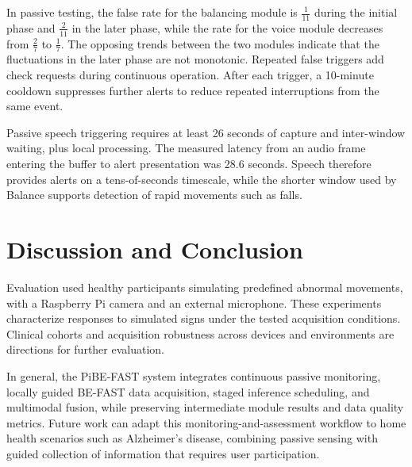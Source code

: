 \documentclass[conference]{IEEEtran}
\providecommand{\revisioncolor}{black}
\DeclareRobustCommand{\revised}[1]{{\color{\revisioncolor}#1}}
\begin{document}
In passive testing, the false rate for the balancing module is $\frac{1}{11}$ during the initial phase and  $\frac{2}{11}$ in the later phase, while the rate for the voice module decreases from $\frac{2}{7}$ to $\frac{1}{7}$. The opposing trends between the two modules indicate that the fluctuations in the later phase are not monotonic.
\revised{Repeated false triggers add check requests during continuous operation. After each trigger, a 10-minute cooldown suppresses further alerts to reduce repeated interruptions from the same event.}

\revised{Passive speech triggering requires at least 26 seconds of capture and inter-window waiting, plus local processing. The measured latency from an audio frame entering the buffer to alert presentation was 28.6 seconds. Speech therefore provides alerts on a tens-of-seconds timescale, while the shorter window used by Balance supports detection of rapid movements such as falls.}

\section{Discussion and Conclusion}
\revised{Evaluation used healthy participants simulating predefined abnormal movements, with a Raspberry Pi camera and an external microphone. These experiments characterize responses to simulated signs under the tested acquisition conditions. Clinical cohorts and acquisition robustness across devices and environments are directions for further evaluation.}

In general, the PiBE-FAST system integrates continuous passive monitoring, locally guided BE-FAST data acquisition, staged inference scheduling, and multimodal fusion, while preserving intermediate module results and data quality metrics. \revised{Future work can adapt this monitoring-and-assessment workflow to home health scenarios such as Alzheimer's disease, combining passive sensing with guided collection of information that requires user participation.}

\end{document}
